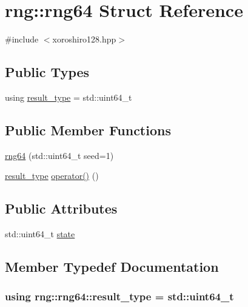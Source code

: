 \hypertarget{structrng_1_1rng64}{}\section{rng\+:\+:rng64 Struct Reference}
\label{structrng_1_1rng64}


{\ttfamily \#include $<$xoroshiro128.\+hpp$>$}

\subsection*{Public Types}
\begin{DoxyCompactItemize}
\item 
using \hyperlink{structrng_1_1rng64_a2ff98eae4172201c4a2623fb99db30d4}{result\+\_\+type} = std\+::uint64\+\_\+t
\end{DoxyCompactItemize}
\subsection*{Public Member Functions}
\begin{DoxyCompactItemize}
\item 
\hyperlink{structrng_1_1rng64_a2e15a3493b634fe580eb3fc00acc3703}{rng64} (std\+::uint64\+\_\+t seed=1)
\item 
\hyperlink{structrng_1_1rng64_a2ff98eae4172201c4a2623fb99db30d4}{result\+\_\+type} \hyperlink{structrng_1_1rng64_ad4ebf7a65a7d459698204e3d31b8e82c}{operator()} ()
\end{DoxyCompactItemize}
\subsection*{Public Attributes}
\begin{DoxyCompactItemize}
\item 
std\+::uint64\+\_\+t \hyperlink{structrng_1_1rng64_a99feef064b5af5eb52aa911d08e8991f}{state}
\end{DoxyCompactItemize}


\subsection{Member Typedef Documentation}
\subsubsection[{\texorpdfstring{result\+\_\+type}{result_type}}]{\setlength{\rightskip}{0pt plus 5cm}using {\bf rng\+::rng64\+::result\+\_\+type} =  std\+::uint64\+\_\+t}\hypertarget{structrng_1_1rng64_a2ff98eae4172201c4a2623fb99db30d4}{}\label{structrng_1_1rng64_a2ff98eae4172201c4a2623fb99db30d4}


